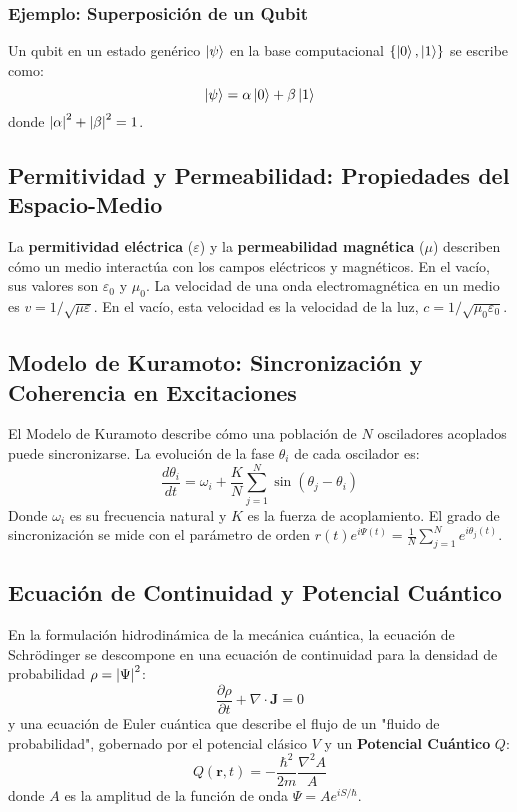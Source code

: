 \documentclass{book}
\begin{document}
\subsubsection{Ejemplo: Superposición de un Qubit}
Un qubit en un estado genérico $\ket{\psi}$ en la base computacional $\{\ket{0}, \ket{1}\}$ se escribe como:
\begin{equation}
    \ket{\psi} = \alpha \ket{0} + \beta \ket{1}
    \label{eq:qubit_superposicion}
\end{equation}
donde $\abs{\alpha}^2 + \abs{\beta}^2 = 1$.

\subsection{Permitividad y Permeabilidad: Propiedades del Espacio-Medio}
\label{sec:permitividad_permeabilidad}
La \textbf{permitividad eléctrica} ($\varepsilon$) y la \textbf{permeabilidad magnética} ($\mu$) describen cómo un medio interactúa con los campos eléctricos y magnéticos. En el vacío, sus valores son $\varepsilon_0$ y $\mu_0$. La velocidad de una onda electromagnética en un medio es $v = 1/\sqrt{\mu \varepsilon}$. En el vacío, esta velocidad es la velocidad de la luz, $c = 1/\sqrt{\mu_0 \varepsilon_0}$.

\subsection{Modelo de Kuramoto: Sincronización y Coherencia en Excitaciones}
\label{sec:kuramoto_model}
El Modelo de Kuramoto describe cómo una población de $N$ osciladores acoplados puede sincronizarse. La evolución de la fase $\theta_i$ de cada oscilador es:
\begin{equation}
    \frac{d\theta_i}{dt} = \omega_i + \frac{K}{N} \sum_{j=1}^{N} \sin(\theta_j - \theta_i)
    \label{eq:kuramoto_main}
\end{equation}
Donde $\omega_i$ es su frecuencia natural y $K$ es la fuerza de acoplamiento. El grado de sincronización se mide con el parámetro de orden $r(t)e^{i\Psi(t)} = \frac{1}{N} \sum_{j=1}^{N} e^{i\theta_j(t)}$.

\subsection{Ecuación de Continuidad y Potencial Cuántico}
\label{sec:quantum_fluid}
En la formulación hidrodinámica de la mecánica cuántica, la ecuación de Schrödinger se descompone en una ecuación de continuidad para la densidad de probabilidad $\rho = \abs{\Psi}^2$:
\begin{equation}
    \frac{\partial \rho}{\partial t} + \nabla \cdot \mathbf{J} = 0
    \label{eq:continuity_quantum}
\end{equation}
y una ecuación de Euler cuántica que describe el flujo de un "fluido de probabilidad", gobernado por el potencial clásico $V$ y un \textbf{Potencial Cuántico} $Q$:
\begin{equation}
    Q(\mathbf{r}, t) = -\frac{\hbar^2}{2m} \frac{\nabla^2 A}{A}
    \label{eq:quantum_potential}
\end{equation}
donde $A$ es la amplitud de la función de onda $\Psi = A e^{iS/\hbar}$.
\end{document}
